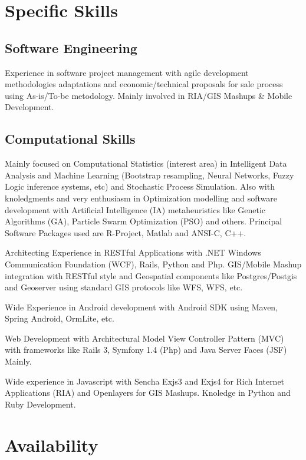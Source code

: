 \documentclass[11pt,letterpaper,roman]{moderncv}
\begin{document}
\section{Specific Skills}
\subsection{Software Engineering}
	{Experience in software project management with agile development
methodologies adaptations and economic/technical proposals for sale process
using As-is/To-be metodology. Mainly involved in RIA/GIS Mashups \& Mobile Development.}
	
\subsection{Computational Skills}
	{Mainly focused on Computational Statistics (interest area) in Intelligent Data Analysis and Machine Learning (Bootstrap resampling, Neural Networks, Fuzzy Logic inference systems, etc)  and Stochastic Process Simulation. Also 
	with knoledgments and very enthusiasm in Optimization modelling and
software development with Artificial Intelligence (IA) metaheuristics like
Genetic Algorithms (GA), Particle Swarm Optimization (PSO) and others. Principal
Software Packages used are R-Project, Matlab and ANSI-C, C++.}

	{Architecting Experience in RESTful Applications with .NET Windows
Communication Foundation (WCF), Rails, Python and Php. GIS/Mobile Mashup
integration with RESTful style and Geospatial components like Postgres/Postgis
and Geoserver using standard GIS protocols like WFS, WFS, etc.}

	{Wide Experience in Android development with Android SDK using Maven,
Spring Android, OrmLite, etc.}

	{Web Development with Architectural Model View Controller Pattern (MVC) with frameworks like Rails 3, Symfony 1.4 (Php) and Java Server Faces (JSF) Mainly.}

	{Wide experience in Javascript with Sencha Exjs3 and Exjs4 for Rich Internet Applications (RIA) and Openlayers for GIS Mashups. Knoledge in Python and Ruby Development.}


\section{Availability}
\end{document}
